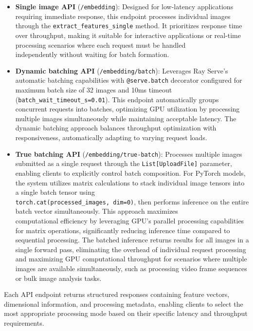 \begin{enumerate}
    \begin{itemize}
        \item \textbf{Single image API} (\texttt{/embedding}): Designed for low-latency applications requiring immediate response, this endpoint processes individual images through the \texttt{extract\_features\_single} method. It prioritizes response time over throughput, making it suitable for interactive applications or real-time processing scenarios where each request must be handled\\independently without waiting for batch formation.
        
        \item \textbf{Dynamic batching API} (\texttt{/embedding/batch}): Leverages Ray Serve's automatic batching capabilities with \texttt{@serve.batch} decorator configured for maximum batch size of 32 images and 10ms timeout \\(\texttt{batch\_wait\_timeout\_s=0.01}). This endpoint automatically groups concurrent requests into batches, optimizing GPU utilization by processing multiple images simultaneously while maintaining acceptable latency. The dynamic batching approach balances throughput optimization with\\responsiveness, automatically adapting to varying request loads.
        
        \item \textbf{True batching API} (\texttt{/embedding/true-batch}): Processes multiple images submitted as a single request through the \texttt{List[UploadFile]} parameter, enabling clients to explicitly control batch composition. For PyTorch models, the system utilizes matrix calculations to stack individual image tensors into a single batch tensor using\\ \texttt{torch.cat(processed\_images, dim=0)}, then performs inference on the entire batch vector simultaneously. This approach maximizes\\ computational efficiency by leveraging GPU's parallel processing capabilities for matrix operations, significantly reducing inference time compared to sequential processing. The batched inference returns results for all images in a single forward pass, eliminating the overhead of individual request processing and maximizing GPU computational throughput for scenarios where multiple images are available simultaneously, such as processing video frame sequences or bulk image analysis tasks.
    \end{itemize}
    
    Each API endpoint returns structured responses containing feature vectors, dimensional information, and processing metadata, enabling clients to select the most appropriate processing mode based on their specific latency and throughput requirements.
\end{enumerate}

